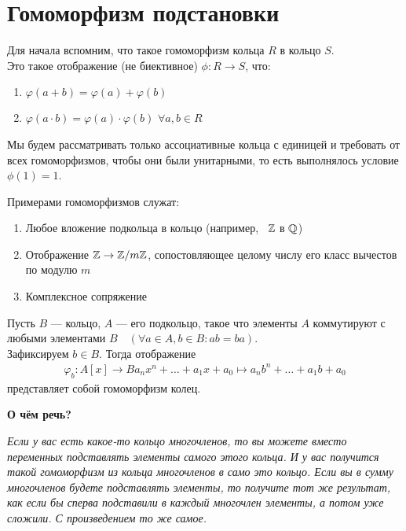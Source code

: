 
\section{Гомоморфизм подстановки}
\begin{normalsize}
    Для начала вспомним, что такое гомоморфизм кольца $R$ в кольцо $S$. \\
    Это такое отображение (не биективное) $\phi: R \rightarrow S$, что:
    \begin{enumerate}
        \item $\varphi(a + b) = \varphi(a) + \varphi(b)$
        \item $\varphi(a\cdot b) = \varphi(a) \cdot \varphi(b)$
        $\forall a,b \in R$
    \end{enumerate}
    Мы будем рассматривать только ассоциативные кольца с единицей и требовать
    от всех гомоморфизмов, чтобы они были унитарными, то есть выполнялось
    условие $\phi(1) = 1$.
    
    Примерами гомоморфизмов служат:
    \begin{enumerate}
        \item Любое вложение подкольца в кольцо (например,  $\mathbb{Z}$ в $\mathbb{Q}$)
        \item Отображение $\mathbb{Z} \rightarrow \mathbb{Z} /m\mathbb{Z}$, сопостовляющее целому числу
        его класс вычестов по модулю $m$
        \item Комплексное сопряжение
    \end{enumerate}

    \begin{theorem-non}
        Пусть $B$ --- кольцо, $A$ --- его подкольцо, такое что элементы
        $A$ коммутируют с любыми элементами $B\quad (\forall a \in A, b \in B: ab = ba)$. \\
        Зафиксируем $b \in B$. Тогда отображение
        \begin{align*}
            \varphi_b: A[x] \rightarrow B
            a_nx^n + \dots + a_1x + a_0 \mapsto a_nb^n + \dots + a_1b + a_0
        \end{align*}
        представляет собой гомоморфизм колец.
    \end{theorem-non}

    \textbf{О чём речь?}

    \emph{Если у вас есть какое-то кольцо многочленов, то вы можете вместо переменных
    подставлять элементы самого этого кольца. И у вас получится такой гомоморфизм из
    кольца многочленов в само это кольцо. Если вы в сумму многочленов будете подставлять элементы,
    то получите тот же результат, как если бы сперва подставили в каждый многочлен элементы,
    а потом уже сложили. С произведением то же самое.} \\
    

\end{normalsize}
